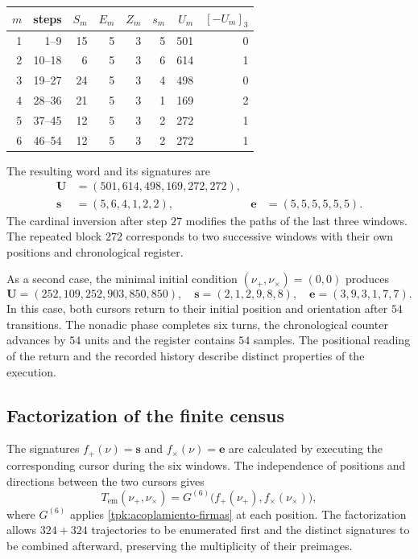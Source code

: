 \begin{tablacompleta}[htbp]
\caption{The six windows of the initial condition \((16,84)\).}
\label{tpk:tabla-seis501}
\begin{tabular}{@{}rrrrrrrr@{}}
\toprule
\(m\)&steps&\(S_m\)&\(E_m\)&\(Z_m\)&\(s_m\)&\(U_m\)&\([-U_m]_3\)\\
\midrule
1&1--9&15&5&3&5&501&0\\
2&10--18&6&5&3&6&614&1\\
3&19--27&24&5&3&4&498&0\\
4&28--36&21&5&3&1&169&2\\
5&37--45&12&5&3&2&272&1\\
6&46--54&12&5&3&2&272&1\\
\bottomrule
\end{tabular}
\end{tablacompleta}

The resulting word and its signatures are
\begin{align*}
 \mathbf U&=(501,614,498,169,272,272),\\
 \mathbf s&=(5,6,4,1,2,2),&
 \mathbf e&=(5,5,5,5,5,5).
\end{align*}
The cardinal inversion after step \(27\) modifies the paths of the
last three windows. The repeated block \(272\) corresponds to two
successive windows with their own positions and chronological register.

As a second case, the minimal initial condition \((\nu_+,\nu_\times)=(0,0)\)
produces
\[
 \mathbf U=(252,109,252,903,850,850),\quad
 \mathbf s=(2,1,2,9,8,8),\quad
 \mathbf e=(3,9,3,1,7,7).
\]
In this case, both cursors return to their initial position and orientation
after \(54\) transitions. The nonadic phase completes six turns, the
chronological counter advances by \(54\) units and the register contains
\(54\) samples. The positional reading of the return and
the recorded history describe distinct properties of the execution.

\subsection{Factorization of the finite census}
\label{tpk:censo}

The signatures \(f_+(\nu)=\mathbf s\) and \(f_\times(\nu)=\mathbf e\) are
calculated by executing the corresponding cursor during the six windows.
The independence of positions and directions between the two cursors gives
\begin{equation}
 T_{\mathrm{em}}(\nu_+,\nu_\times)
   =G^{(6)}\bigl(f_+(\nu_+),f_\times(\nu_\times)\bigr),
 \label{tpk:factorizacion}
\end{equation}
where \(G^{(6)}\) applies \eqref{tpk:acoplamiento-firmas} at each position.
The factorization allows \(324+324\) trajectories to be enumerated first and
the distinct signatures to be combined afterward, preserving the multiplicity of
their preimages.

